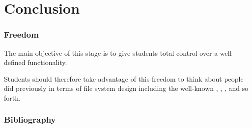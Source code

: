 %
%

\section{Conclusion}


\begin{frame}
  \frametitle{Freedom}

  The main objective of this stage is to give students total control over
  a well-defined functionality.

  \-

  Students should therefore take advantage of this freedom to think about
  people did previously in terms of file system design including the well-known
  , , ,  and so forth.
\end{frame}

%
%

\begin{frame}
  \frametitle{Bibliography}

  
  
\end{frame}


